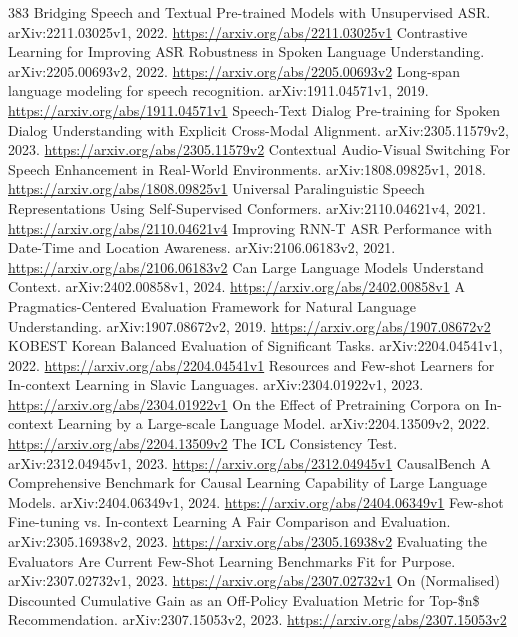 \documentclass[11pt]{article}
\begin{document}
\begin{thebibliography}{383}
 Bridging Speech and Textual Pre-trained Models with Unsupervised ASR. arXiv:2211.03025v1, 2022. \url{https://arxiv.org/abs/2211.03025v1}
 Contrastive Learning for Improving ASR Robustness in Spoken Language Understanding. arXiv:2205.00693v2, 2022. \url{https://arxiv.org/abs/2205.00693v2}
 Long-span language modeling for speech recognition. arXiv:1911.04571v1, 2019. \url{https://arxiv.org/abs/1911.04571v1}
 Speech-Text Dialog Pre-training for Spoken Dialog Understanding with Explicit Cross-Modal Alignment. arXiv:2305.11579v2, 2023. \url{https://arxiv.org/abs/2305.11579v2}
 Contextual Audio-Visual Switching For Speech Enhancement in Real-World Environments. arXiv:1808.09825v1, 2018. \url{https://arxiv.org/abs/1808.09825v1}
 Universal Paralinguistic Speech Representations Using Self-Supervised Conformers. arXiv:2110.04621v4, 2021. \url{https://arxiv.org/abs/2110.04621v4}
 Improving RNN-T ASR Performance with Date-Time and Location Awareness. arXiv:2106.06183v2, 2021. \url{https://arxiv.org/abs/2106.06183v2}
 Can Large Language Models Understand Context. arXiv:2402.00858v1, 2024. \url{https://arxiv.org/abs/2402.00858v1}
 A Pragmatics-Centered Evaluation Framework for Natural Language Understanding. arXiv:1907.08672v2, 2019. \url{https://arxiv.org/abs/1907.08672v2}
 KOBEST Korean Balanced Evaluation of Significant Tasks. arXiv:2204.04541v1, 2022. \url{https://arxiv.org/abs/2204.04541v1}
 Resources and Few-shot Learners for In-context Learning in Slavic Languages. arXiv:2304.01922v1, 2023. \url{https://arxiv.org/abs/2304.01922v1}
 On the Effect of Pretraining Corpora on In-context Learning by a Large-scale Language Model. arXiv:2204.13509v2, 2022. \url{https://arxiv.org/abs/2204.13509v2}
 The ICL Consistency Test. arXiv:2312.04945v1, 2023. \url{https://arxiv.org/abs/2312.04945v1}
 CausalBench A Comprehensive Benchmark for Causal Learning Capability of Large Language Models. arXiv:2404.06349v1, 2024. \url{https://arxiv.org/abs/2404.06349v1}
 Few-shot Fine-tuning vs. In-context Learning A Fair Comparison and Evaluation. arXiv:2305.16938v2, 2023. \url{https://arxiv.org/abs/2305.16938v2}
 Evaluating the Evaluators Are Current Few-Shot Learning Benchmarks Fit for Purpose. arXiv:2307.02732v1, 2023. \url{https://arxiv.org/abs/2307.02732v1}
 On (Normalised) Discounted Cumulative Gain as an Off-Policy Evaluation Metric for Top-\$n\$ Recommendation. arXiv:2307.15053v2, 2023. \url{https://arxiv.org/abs/2307.15053v2}

\end{thebibliography}
\end{document}
